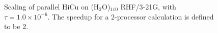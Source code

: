 \documentclass[preprint]{revtex4}
\begin{document}
\begin{figure}[t]
\caption{Scaling of parallel HiCu on (H$_2$O)$_{110}$ RHF/3-21G, with
$\tau = 1.0 \times 10^{-6}$. The speedup for a 2-processor calculation
is defined to be 2.}
\label{fig:waterscaling}
\end{figure}
\end{document}
